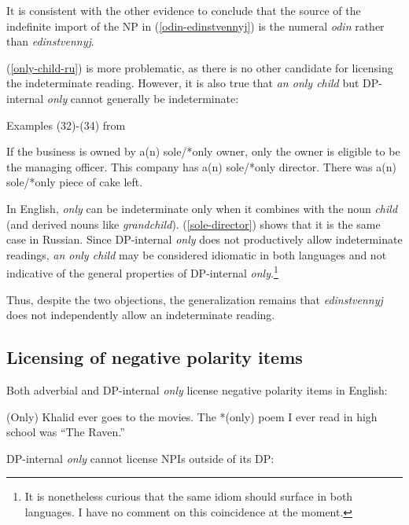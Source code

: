 \documentclass{article}
\begin{document}
It is consistent with the other evidence to conclude that the source of the indefinite import of the NP in (\ref{odin-edinstvennyj}) is the numeral \textit{odin} rather than \textit{edinstvennyj}.

(\ref{only-child-ru}) is more problematic, as there is no other candidate for licensing the indeterminate reading. However, it is also true that \textit{an only child} but DP-internal \textit{only} cannot generally be indeterminate:


\begin{exe}
	\ex Examples (32)-(34) from \citet{cb2012a} \begin{xlist}
		\ex If the business is owned by a(n) sole/*only owner, only the owner is eligible to be the managing officer.
		\ex This company has a(n) sole/*only director.
		\ex There was a(n) sole/*only piece of cake left.
	\end{xlist}
\end{exe}

In English, \textit{only} can be indeterminate only when it combines with the noun \textit{child} (and derived nouns like \textit{grandchild}). (\ref{sole-director}) shows that it is the same case in Russian. Since DP-internal \textit{only} does not productively allow indeterminate readings, \textit{an only child} may be considered idiomatic in both languages and not indicative of the general properties of DP-internal \textit{only}.\footnote{It is nonetheless curious that the same idiom should surface in both languages. I have no comment on this coincidence at the moment.}

Thus, despite the two objections, the generalization remains that \textit{edinstvennyj} does not independently allow an indeterminate reading.

\subsection{Licensing of negative polarity items}
Both adverbial and DP-internal \textit{only} license negative polarity items in English:

\begin{exe}
	\ex *(Only) Khalid ever goes to the movies.
	\ex The *(only) poem I ever read in high school was ``The Raven.''
\end{exe}

DP-internal \textit{only} cannot license NPIs outside of its DP:
\end{document}
